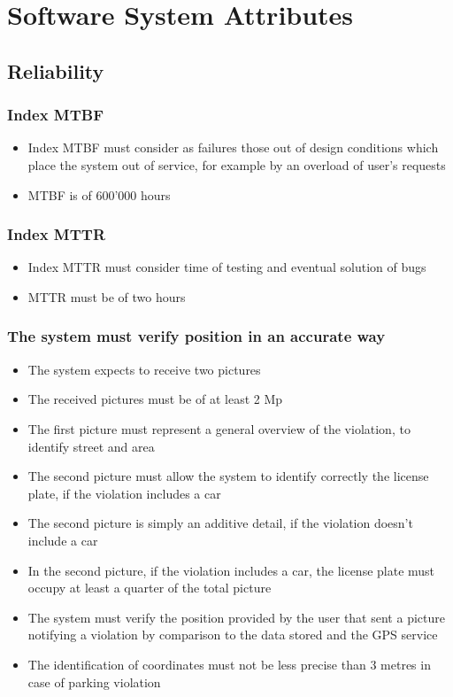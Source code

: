 \section{Software System Attributes}

\subsection{Reliability}
\subsubsection{Index MTBF}
\begin{itemize}
    \item Index MTBF must consider as failures those out of design conditions which place the system out of service, for example by an overload of user’s requests
    \item MTBF is of 600'000 hours
\end{itemize}

\subsubsection{Index MTTR}
\begin{itemize}
    \item Index MTTR must consider time of testing and eventual solution of bugs
    \item MTTR must be of two hours
\end{itemize}

\subsubsection{The system must verify position in an accurate way}
\begin{itemize}
    \item The system expects to receive two pictures			
    \item The received pictures must be of at least 2 Mp
    \item The first picture must represent a general overview of the violation, to identify street and area
    \item The second picture must allow the system to identify correctly the license plate, if the violation includes a car
    \item The second picture is simply an additive detail, if the violation doesn't include a car
    \item In the second picture, if the violation includes a car, the license plate must occupy at least a quarter of the total picture
    \item The system must verify the position provided by the user that sent a picture notifying a violation by comparison to the data stored and the GPS service
    \item The identification of coordinates must not be less precise than 3 metres in case of parking violation
\end{itemize}

